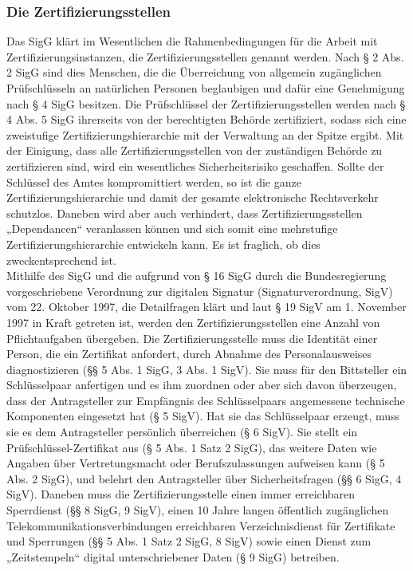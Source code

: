 \subsubsection{Die Zertifizierungsstellen}
Das SigG klärt im Wesentlichen die Rahmenbedingungen für die Arbeit mit Zertifizierungsinstanzen, die Zertifizierungsstellen genannt werden. Nach § 2 Abs. 2 SigG sind dies Menschen, die die Überreichung von allgemein zugänglichen Prüfschlüsseln an natürlichen Personen beglaubigen und dafür eine Genehmigung nach § 4 SigG besitzen. Die Prüfschlüssel der Zertifizierungsstellen werden nach § 4 Abs. 5 SigG ihrerseits von der berechtigten Behörde zertifiziert, sodass sich eine zweistufige Zertifizierungshierarchie mit der Verwaltung an der Spitze ergibt. Mit der Einigung, dass alle Zertifizierungsstellen von der zuständigen Behörde zu zertifizieren sind, wird ein wesentliches Sicherheitsrisiko geschaffen. Sollte der Schlüssel des Amtes kompromittiert werden, so ist die ganze Zertifizierungshierarchie und damit der gesamte elektronische Rechtsverkehr schutzlos. Daneben wird aber auch verhindert, dass Zertifizierungsstellen „Dependancen“ veranlassen können und sich somit eine mehrstufige Zertifizierungshierarchie entwickeln kann. Es ist fraglich, ob dies zweckentsprechend ist. \\

Mithilfe des SigG und die aufgrund von § 16 SigG durch die Bundesregierung vorgeschriebene Verordnung zur digitalen Signatur (Signaturverordnung, SigV) vom 22. Oktober 1997, die Detailfragen klärt und laut § 19 SigV am 1. November 1997 in Kraft getreten ist, werden den Zertifizierungsstellen eine Anzahl von Pflichtaufgaben übergeben. Die Zertifizierungsstelle muss die Identität einer Person, die ein Zertifikat anfordert, durch Abnahme des Personalausweises diagnostizieren (§§ 5 Abs. 1 SigG, 3 Abs. 1 SigV). Sie muss für den Bittsteller ein Schlüsselpaar anfertigen und es ihm zuordnen oder aber sich davon überzeugen, dass der Antragsteller zur Empfängnis des Schlüsselpaars angemessene technische Komponenten eingesetzt hat (§ 5 SigV). Hat sie das Schlüsselpaar erzeugt, muss sie es dem Antragsteller persönlich überreichen (§ 6 SigV). Sie stellt ein Prüfschlüssel-Zertifikat aus (§ 5 Abs. 1 Satz 2 SigG), das weitere Daten wie Angaben über Vertretungsmacht oder Berufszulassungen aufweisen kann (§ 5 Abs. 2 SigG), und belehrt den Antragsteller über Sicherheitsfragen (§§ 6 SigG, 4 SigV). Daneben muss die Zertifizierungsstelle einen immer erreichbaren Sperrdienst (§§ 8 SigG, 9 SigV), einen 10 Jahre langen öffentlich zugänglichen Telekommunikationsverbindungen erreichbaren Verzeichnisdienst für Zertifikate und Sperrungen (§§ 5 Abs. 1 Satz 2 SigG, 8 SigV) sowie einen Dienst zum „Zeitstempeln“ digital unterschriebener Daten (§ 9 SigG) betreiben.

